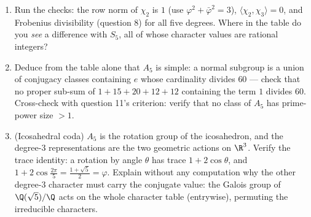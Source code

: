 \begin{problem}
\begin{enumerate}[resume]
        $\chi_3(c^2) = x$. From the column of $c$ paired with
        the identity column and with the column of $c^2$, derive
        $x + y = 1$ and $xy = -1$ (and check the value $x^2 +
        y^2 = 3$ given by the column of $c$ with itself), hence
        \[
        \{x, y\} = \Bigl\{\frac{1 + \sqrt5}2,\ \frac{1 -
        \sqrt5}2\Bigr\} :
        \]
        the golden ratio and its conjugate. Assemble the
        complete character table of $A_5$.
  \item Run the checks: the row norm of $\chi_2$ is $1$ (use
        $\varphi^2 + \bar\varphi^2 = 3$), $\langle\chi_2,
        \chi_3\rangle = 0$, and Frobenius divisibility (question
        8) for all five degrees. Where in the table do you
        \emph{see} a difference with $S_5$, all of whose
        character values are rational integers?
  \item Deduce from the table alone that $A_5$ is simple: a
        normal subgroup is a union of conjugacy classes
        containing $e$ whose cardinality divides $60$ --- check
        that no proper sub-sum of $1 + 15 + 20 + 12 + 12$
        containing the term $1$ divides $60$. Cross-check with
        question 11's criterion: verify that no class of $A_5$
        has prime-power size $> 1$.
  \item (Icosahedral coda) $A_5$ is the rotation group of the
        icosahedron, and the degree-$3$ representations are the
        two geometric actions on $\R^3$. Verify the trace
        identity: a rotation by angle $\theta$ has trace $1 +
        2\cos\theta$, and $1 + 2\cos\frac{2\pi}5 =
        \frac{1+\sqrt5}2 = \varphi$. Explain without any
        computation why the other degree-$3$ character must
        carry the conjugate value: the Galois group of
        $\Q(\sqrt5)/\Q$ acts on the whole character table
        (entrywise), permuting the irreducible characters.
\end{enumerate}


\end{problem}

